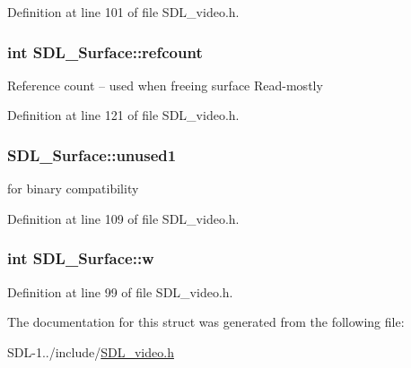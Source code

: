 Definition at line 101 of file S\+D\+L\+\_\+video.\+h.

\hypertarget{struct_s_d_l___surface_a03d10628a359c0674f5ceffd574f1641}{}
\subsubsection[{refcount}]{\setlength{\rightskip}{0pt plus 5cm}int S\+D\+L\+\_\+\+Surface\+::refcount}\label{struct_s_d_l___surface_a03d10628a359c0674f5ceffd574f1641}
Reference count -- used when freeing surface Read-\/mostly 

Definition at line 121 of file S\+D\+L\+\_\+video.\+h.

\hypertarget{struct_s_d_l___surface_a41066cf7cc91d2f032dd0f29cc418ec4}{}
\subsubsection[{unused1}]{ S\+D\+L\+\_\+\+Surface\+::unused1}\label{struct_s_d_l___surface_a41066cf7cc91d2f032dd0f29cc418ec4}
for binary compatibility 

Definition at line 109 of file S\+D\+L\+\_\+video.\+h.

\hypertarget{struct_s_d_l___surface_a9b0ec7185dcdb2a3530a9160a6ea83d9}{}
\subsubsection[{w}]{\setlength{\rightskip}{0pt plus 5cm}int S\+D\+L\+\_\+\+Surface\+::w}\label{struct_s_d_l___surface_a9b0ec7185dcdb2a3530a9160a6ea83d9}


Definition at line 99 of file S\+D\+L\+\_\+video.\+h.



The documentation for this struct was generated from the following file\+:\begin{DoxyCompactItemize}
\item 
S\+D\+L-\/1../include/\hyperlink{_s_d_l__video_8h}{S\+D\+L\+\_\+video.\+h}\end{DoxyCompactItemize}

